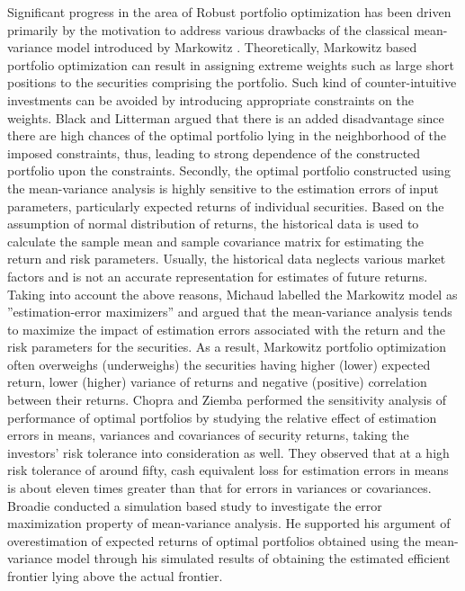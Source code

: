 \documentclass[12pt]{article}
\numberwithin{equation}{section}
\begin{document}
Significant progress in the area of Robust portfolio optimization has been driven primarily by the motivation to address various drawbacks of the classical mean-variance model introduced by Markowitz \cite{Markowitz1,Markowitz2}. Theoretically, Markowitz based portfolio optimization can result in assigning extreme weights such as large short positions to the securities comprising the portfolio. Such kind of counter-intuitive investments can be avoided by introducing appropriate constraints on the weights. Black and Litterman \cite{Black} argued that there is an added disadvantage since there are high chances of the optimal portfolio lying in the neighborhood of the imposed constraints, thus, leading to strong dependence of the constructed portfolio upon the constraints. Secondly, the optimal portfolio constructed using the mean-variance analysis is highly sensitive to the estimation errors of input parameters, particularly expected returns of individual securities. Based on the assumption of normal distribution of returns, the historical data is used to calculate the sample mean and sample covariance matrix for estimating the return and risk parameters. Usually, the historical data neglects various market factors and is not an accurate representation for estimates of future returns. Taking into account the above reasons, Michaud \cite{Michaud} labelled the Markowitz model as ''estimation-error maximizers'' and argued that the mean-variance analysis tends to maximize the impact of estimation errors associated with the return and the risk parameters for the securities. As a result, Markowitz portfolio optimization often overweighs (underweighs) the securities having higher (lower) expected return, lower (higher) variance of returns and negative (positive) correlation between their returns. Chopra and Ziemba \cite{Chopra} performed the sensitivity analysis of performance of optimal portfolios by studying the relative effect of estimation errors in means, variances and covariances of security returns, taking the investors' risk tolerance into consideration as well. They observed that at a high risk tolerance of around fifty, cash equivalent loss for estimation errors in means is about eleven times greater than that for errors in variances or covariances. Broadie \cite{Broadie} conducted a simulation based study to investigate the error maximization property of mean-variance analysis. He supported his argument of overestimation of expected returns of optimal portfolios obtained using the mean-variance model through his simulated results of obtaining the estimated efficient frontier lying above the actual frontier.
\end{document}
